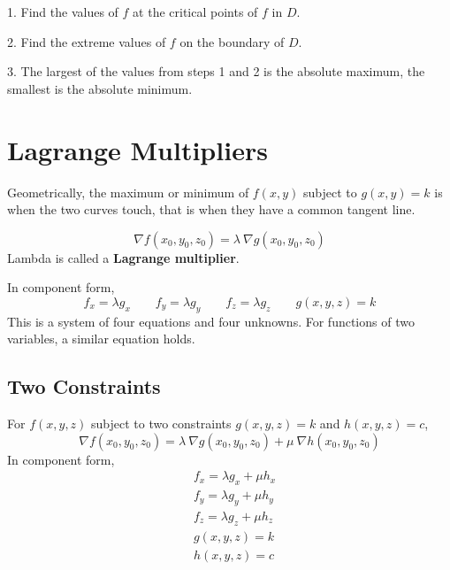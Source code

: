 \documentclass{report}  %
\begin{document}
1. Find the values of $f$ at the critical points of $f$ in $D$. 

2. Find the extreme values of $f$ on the boundary of $D$.

3. The largest of the values from steps 1 and 2 is the absolute maximum, the smallest is the absolute minimum. 

\newpage 

\section{Lagrange Multipliers}
Geometrically, the maximum or minimum of $f(x, y)$ subject to $g(x, y) = k$ is when the two curves touch, that is when they have a common tangent line. 

\begin{equation}
	\nabla f (x_0, y_0, z_0) = \lambda \ \nabla g (x_0, y_0, z_0)
\end{equation}
Lambda is called a \textbf{Lagrange multiplier}. 

In component form, 
\begin{equation}
	f_x = \lambda g_x \qquad
	f_y = \lambda g_y \qquad
	f_z = \lambda g_z \qquad
	g(x, y, z) = k
\end{equation}
This is a system of four equations and four unknowns. For functions of two variables, a similar equation holds. 

\subsection*{Two Constraints}
For $f(x, y, z)$ subject to two constraints $g(x, y, z) = k$ and $h(x, y, z) = c$,
\begin{equation}
	\nabla f (x_0, y_0, z_0) = \lambda \ \nabla g (x_0, y_0, z_0) + \mu \ \nabla h (x_0, y_0, z_0)
\end{equation}
In component form, 
\begin{equation}
\begin{aligned}
	&f_x = \lambda g_x + \mu h_x \\
	&f_y = \lambda g_y + \mu h_y \\
	&f_z = \lambda g_z + \mu h_z \\
	&g(x, y, z) = k \\
	&h(x, y, z) = c
\end{aligned}
\end{equation}
\end{document}
